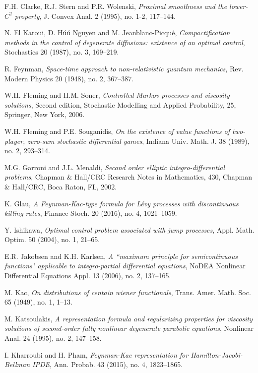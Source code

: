 \documentclass[amscd,amssymb,11pt]{article}
\numberwithin{theorem}{section}
\numberwithin{equation}{section}
\begin{document}
\begin{thebibliography}{99}
 F.H. Clarke, R.J. Stern and P.R. Wolenski, {\it Proximal smoothness and the lower-$C^2$ property}, J. Convex Anal. 2 (1995), no. 1-2, 117--144.

N. El Karoui, D. H\'u\'u Nguyen and M. Jeanblanc-Picqu\'e, {\it Compactification methods in the control of degenerate diffusions: existence of an optimal control}, Stochastics 20 (1987), no. 3, 169--219. 

R. Feynman, {\it Space-time approach to non-relativistic quantum mechanics}, Rev. Modern Physics 20 (1948), no. 2, 367--387.

W.H. Fleming and H.M. Soner, {\it Controlled Markov processes and viscosity solutions}, Second edition, Stochastic Modelling and Applied Probability, 25, Springer, New York, 2006.

W.H. Fleming and P.E. Souganidis, {\it On the existence of value functions of two-player, zero-sum stochastic differential games}, Indiana Univ. Math. J. 38 (1989), no. 2, 293--314.

M.G. Garroni and J.L. Menaldi, {\it Second order elliptic integro-differential problems}, Chapman \& Hall/CRC Research Notes in Mathematics, 430, Chapman \& Hall/CRC, Boca Raton, FL, 2002.


K. Glau, {\it A Feynman-Kac-type formula for L\'{e}vy processes with discontinuous killing rates}, Finance Stoch. 20 (2016), no. 4, 1021--1059.

 Y. Ishikawa, {\it Optimal control problem associated with jump processes}, Appl. Math. Optim. 50 (2004), no. 1, 21--65.

 E.R. Jakobsen and K.H. Karlsen, {\it A ``maximum principle for semicontinuous functions" applicable
to integro-partial differential equations}, NoDEA Nonlinear Differential Equations Appl. 13 (2006), no. 2, 137--165.

 M. Kac, {\it On distributions of centain wiener functionals}, Trans. Amer. Math. Soc. 65 (1949), no. 1, 1--13.

 M. Katsoulakis, {\it A representation formula and regularizing properties for viscosity solutions of second-order fully nonlinear degenerate parabolic equations}, Nonlinear Anal. 24 (1995), no. 2, 147--158.

 I. Kharroubi and H. Pham, {\it Feynman-Kac representation for Hamilton-Jacobi-Bellman IPDE}, Ann. Probab. 43 (2015), no. 4, 1823--1865.


\end{thebibliography}
\end{document}
